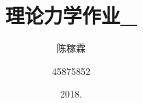 \documentclass[10pt,a4paper]{article}
\title{理论力学作业\_}
\author{陈稼霖 \and 45875852}
\date{2018.}
\begin{document}
\maketitle
\section*{}
\subsection*{}
\end{document}
